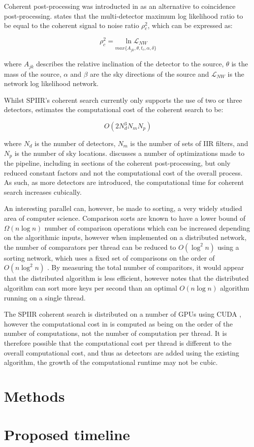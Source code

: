 \documentclass{article}
\begin{document}
Coherent post-processing was introducted in \cite{ChuThesis} as an alternative to coincidence
post-processing. \cite{ChuThesis} states that the multi-detector maximum log likelihood ratio to be
equal to the coherent signal to noise ratio \(\rho{}^2_c\), which can be expressed as:

\begin{equation}
    \rho^2_c = \underset{max\{A_{jk},\theta,t_{c},\alpha,\delta\}}{\ln \mathcal{L}_{NW}}
\end{equation}

where \(A_{jk}\) describes the relative inclination of the detector to the source, \(\theta\) is the
mass of the source, \(\alpha\) and \(\beta\) are the sky directions of the source and
\(\mathcal{L}_{NW}\) is the network log likelihood network.

Whilst SPIIR's coherent search currently only supports the use of two or three detectors,
\cite{ChuThesis} estimates the computational cost of the coherent search to be:

\begin{equation}
    O(2N^3_dN_mN_p)
\end{equation}

where \(N_d\) is the number of detectors, \(N_m\) is the number of sets of IIR filters, and \(N_p\)
is the number of sky locations. \cite{SPIIRGPU2018} discusses a number of optimizations made to the
pipeline, including in sections of the coherent post-processing, but only reduced constant factors
and not the computational cost of the overall process. As such, as more detectors are introduced,
the computational time for coherent search increases cubically.

An interesting parallel can, however, be made to sorting, a very widely studied area of computer
science. Comparison sorts are known to have a lower bound of \(\Omega{}(n\log{n})\) number of
comparison operations \cite{CLRS} which can be increased depending on the algorithmic inputs,
however when implemented on a distributed network, the number of comparators per thread can be
reduced to \(O(\log^2{n})\) using a sorting network, which uses a fixed set of comparisons on the
order of \(O(n\log^2{n})\) \cite{nvidia}. By measuring the total number of comparitors, it would
appear that the distributed algorithm is less efficient, however \cite{nvidia} notes that the
distributed algorithm can sort more keys per second than an optimal \(O(n\log{n})\) algorithm
running on a single thread.

The SPIIR coherent search is distributed on a number of GPUs using CUDA \cite{SPIIRGPU2018}, however
the computational cost in \cite{ChuThesis} is computed as being on the order of the number of
computations, not the number of computation per thread. It is therefore possible that the
computational cost per thread is different to the overall computational cost, and thus as detectors
are added using the existing algorithm, the growth of the computational runtime may not be cubic.

\section{Methods}
\section{Proposed timeline}
\printbibliography[
    heading=bibintoc,
    title={Bibliography}
]{}
\end{document}
